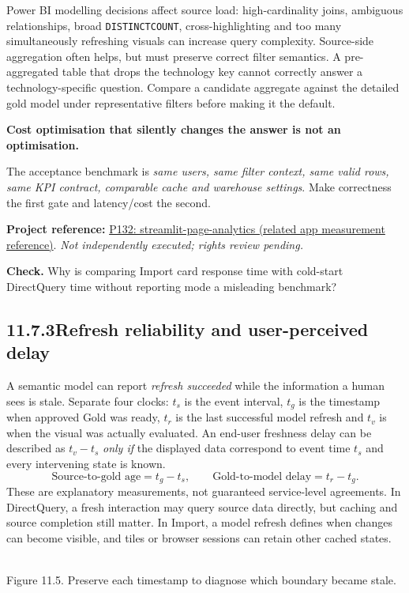 \documentclass[11pt,twoside]{article}
\newcommand{\topic}[2]{\subsection*{#1\quad #2}}
\newcommand{\repo}[2]{\par\begingroup\fontsize{8.0}{9.6}\selectfont\sffamily\color{inkgray}\textbf{Project reference:} \href{#2}{#1}. \textit{Not independently executed; rights review pending.}\par\endgroup}
\begin{document}
Power BI modelling decisions affect source load: high-cardinality joins, ambiguous relationships, broad \texttt{DISTINCTCOUNT}, cross-highlighting and too many simultaneously refreshing visuals can increase query complexity. Source-side aggregation often helps, but must preserve correct filter semantics. A pre-aggregated table that drops the technology key cannot correctly answer a technology-specific question. Compare a candidate aggregate against the detailed gold model under representative filters before making it the default.
\begin{insight}\textbf{Cost optimisation that silently changes the answer is not an optimisation.}\par
The acceptance benchmark is \emph{same users, same filter context, same valid rows, same KPI contract, comparable cache and warehouse settings}. Make correctness the first gate and latency/cost the second.\end{insight}
\repo{P132: streamlit-page-analytics (related app measurement reference)}{https://github.com/Snowflake-Labs/streamlit-page-analytics}
\textbf{Check.} Why is comparing Import card response time with cold-start DirectQuery time without reporting mode a misleading benchmark?
\newpage
\topic{11.7.3}{Refresh reliability and user-perceived delay}
A semantic model can report \emph{refresh succeeded} while the information a human sees is stale. Separate four clocks: $t_s$ is the event interval, $t_g$ is the timestamp when approved Gold was ready, $t_r$ is the last successful model refresh and $t_v$ is when the visual was actually evaluated. An end-user freshness delay can be described as $t_v-t_s$ \emph{only if} the displayed data correspond to event time $t_s$ and every intervening state is known.
\[
\text{Source-to-gold age}=t_g-t_s,\qquad
\text{Gold-to-model delay}=t_r-t_g.
\]
These are explanatory measurements, not guaranteed service-level agreements. In DirectQuery, a fresh interaction may query source data directly, but caching and source completion still matter. In Import, a model refresh defines when changes can become visible, and tiles or browser sessions can retain other cached states.
\begin{center}\\{\fontsize{8}{9}\selectfont\color{inkgray}Figure 11.5. Preserve each timestamp to diagnose which boundary became stale.}\end{center}
\end{document}
